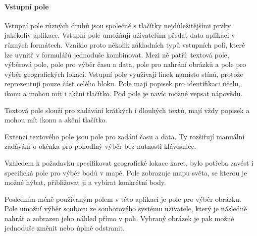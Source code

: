 
			\paragraph{Vstupní pole}

			Vstupní pole různých druhů jsou společně s tlačítky nejdůležitějšími prvky jakékoliv aplikace.
			Vstupní pole umožňují uživatelům předat data aplikaci v různých formátech.
			Vzniklo proto několik základních typů vstupních polí, které lze uvnitř v formulářů jednoduše kombinovat.
			Mezi ně patří: textová pole, výběrová pole, pole pro výběr času a data, pole pro nahrání obrázků a pole pro
			výběr geografických lokací.
			Vstupní pole využívají linek namísto stínů, protože reprezentují pouze část celého bloku.
			Pole mají popisek pro identifikaci účelu, ikonu a mohou mít i akční tlačítko.
			Pod pole je navíc možné vepsat nápovědu.

			Textová pole slouží pro zadávání krátkých i dlouhých textů, mají vždy popisek a mohou mít ikonu a
			akční tlačítko.


			\newpage

			Extenzí textového pole jsou pole pro zadání času a data.
			Ty rozšiřují manuální zadávání o okénka pro pohodlný výběr bez nutnosti klávesnice.


			Vzhledem k požadavku specifikovat geografické lokace karet, bylo potřeba zavést i specifická pole
			pro výběr bodů v mapě.
			Pole zobrazuje mapu světa, se kterou je možné hýbat, přibližovat ji a vybírat konkrétní body.


			\newpage

			Posledním méně používaným polem v této aplikaci je pole pro výběr obrázku.
			Pole umožní výběr souboru ze souborového systému uživatele, který je následně nahrát a zobrazen jeho náhled
			přímo v poli.
			Vybraný obrázek je pak možné jednoduše změnit nebo úplně odstranit.


